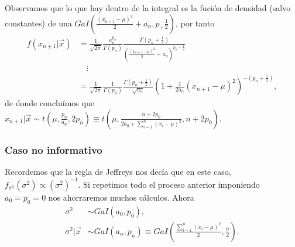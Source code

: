 Observamos que lo que hay dentro de la integral es la fución de densidad (salvo constantes) de una $GaI\left( \frac{(x_{n+1} - \mu)^2}{2} + a_n, p_ + \frac{1}{2} \right)$, por tanto
\begin{align*}
    f(x_{n+1} | \vec{x}) & = \frac{1}{\sqrt{2\pi}}\frac{a_n^{p_n}}{\Gamma(p_n)} \frac{\Gamma\left(p_n + \frac{1}{2} \right)}{\left(\frac{(x_{n+1} - \mu)^2}{2} + a_n \right)^{p_n + \frac{1}{2}}}                         \\
                         & \quad \vdots                                                                                                                                                                                   \\
                         & = \frac{1}{\sqrt{2\pi}} \frac{1}{\Gamma(p_n)} \frac{\Gamma \left( p_n + \frac{1}{2} \right)}{\sqrt{a_n}} \left(1 + \frac{1}{2a_n}(x_{n+1} - \mu)^2 \right)^{-\left(p_n + \frac{1}{2} \right)},
\end{align*}
de donde concluímos que $x_{n+1} | \vec{x} \sim t\left(\mu, \frac{p_n}{a_n}, 2p_n \right) \equiv t\left(\mu, \frac{n + 2p_0}{2a_0 + \sum_{i=1}^{n} (x_i - \mu)^2}, n + 2p_0 \right)$.
\subsubsection{Caso no informativo}
Recordemos que la regla de Jeffreys nos decía que en este caso, $f_{\sigma^2}(\sigma^2) \propto \left(\sigma^2 \right)^{-1}$. Si repetimos todo el proceso anterior imponiendo $a_0 = p_0 =0$ nos ahorraremos muchos cálculos. Ahora
\begin{align*}
    \sigma^2           & \sim GaI(a_0,p_0),                                                                            \\
    \sigma^2 | \vec{x} & \sim GaI(a_n,p_n) \equiv GaI\left(\frac{\sum_{i=1}^{n} (x_i- \mu)^2}{2}, \frac{n}{2} \right).
\end{align*}

